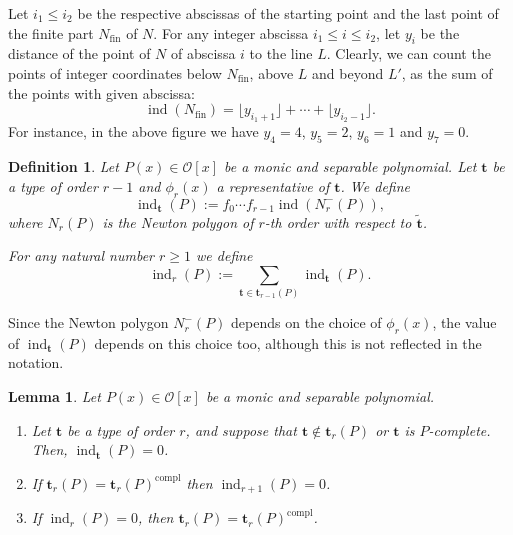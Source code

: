 \documentclass{amsart}
\newtheorem{lemma}[theorem]{Lemma}
\newtheorem{definition}[theorem]{Definition}
\def\op{\operatorname}
\def\ind{\op{ind}}
\def\oo{{\mathcal O}}
\def\ty{\mathbf{t}}
\def\zpx{\oo[x]}
\begin{document}
Let  $i_1\le i_2$ be the respective abscissas of the starting point and the last point of the finite part $N_{\op{fin}}$ of $N$.  
For any integer abscissa $i_1\le i\le i_2$, let $y_i$ be the distance of the point of $N$ of abscissa $i$ to the line $L$. Clearly, we can count the points of integer coordinates below $N_{\op{fin}}$, above $L$ and beyond $L'$, as the sum of the points with given abscissa: 
\begin{equation}\label{combi}
\ind(N_{\op{fin}})=\lfloor y_{i_1+1}\rfloor+\cdots+\lfloor y_{i_2-1}\rfloor.
\end{equation}
For instance, in the above figure we have $y_4=4$, $y_5=2$, $y_6=1$ and $y_7=0$.

\begin{definition}
Let $P(x)\in\zpx$ be a monic and separable polynomial. 
Let $\ty$ be a type of order $r-1$ and $\phi_r(x)$ a representative of $\ty$. We define
$$\ind_\ty(P):=f_0\cdots f_{r-1}\ind({N_r^-}(P)),$$
where $N_r(P)$ is the Newton polygon of $r$-th order with respect to $\tilde{\ty}$.

For any natural number $r\ge 1$ we define
$$
\ind_r(P):=\sum_{\ty\in\ty_{r-1}(P)}\ind_\ty(P).
$$
\end{definition}

Since the Newton polygon $N_{r}^-(P)$ depends on the choice of $\phi_{r}(x)$, the value of $\ind_\ty(P)$ depends on this choice too, although this is not reflected in the notation. 

\begin{lemma}\label{zeroind}
Let $P(x)\in\zpx$ be a monic and separable polynomial. 
\begin{enumerate}
\item Let $\ty$ be a type of order $r$, and suppose that $\ty\not\in\ty_r(P)$ or $\ty$ is $P$-complete. Then, $\ind_{\ty}(P)=0$.
\item If $\ty_r(P)=\ty_r(P)^{\op{compl}}$ then $\ind_{r+1}(P)=0$.
\item If $\ind_r(P)=0$, then $\ty_r(P)=\ty_r(P)^{\op{compl}}$.
\end{enumerate}
\end{lemma}
\end{document}
